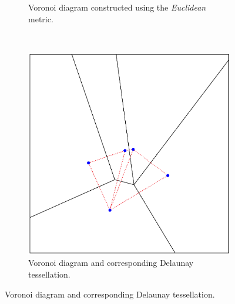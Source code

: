 \documentclass[preprint, 12pt]{elsarticle}
\begin{document}
\begin{figure}
\begin{subfigure}[b]{0.315\textwidth}
		\caption{Voronoi diagram constructed using the \emph{Euclidean} metric.}
		\label{fig:euclidean}
	\end{subfigure}
	~
	\begin{subfigure}[b]{0.315\textwidth}
		\includegraphics[width=\textwidth]{Graphics/Voronoi_Delaunay.pdf}
		\caption{Voronoi diagram and corresponding Delaunay tessellation.}
		\label{fig:delaunay}
	\end{subfigure}
	\label{fig:voronoi}
\end{figure}
\end{document}
